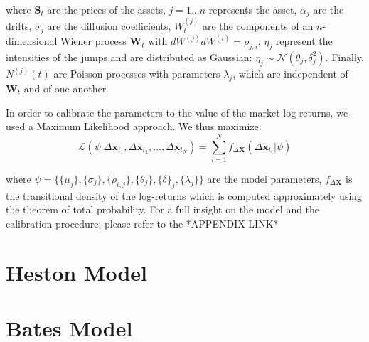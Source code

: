 where $\mathbf{S}_t$ are the prices of the assets, $j = 1 ... n$ represents the asset, $\alpha_j$ are the drifts, $\sigma_j$ are the diffusion coefficients, $W^{(j)}_t$ are the components of an $n$-dimensional Wiener process $ \mathbf{W}_t$ with $dW^{(j)}dW^{(i)}=\rho_{j,i}$, $\eta_j$ represent the intensities of the jumps and are distributed as Gaussian: $\eta_j \sim \mathcal{N}(\theta_j , \delta_j^2)$. Finally, $N^{(j)}(t)$ are Poisson processes with parameters $\lambda_j$, which are independent of $\mathbf{W}_t$ and of one another. 

In order to calibrate the parameters to the value of the market log-returns, we used a Maximum Likelihood approach. We thus maximize:
\begin{equation}
\mathcal{L}(\psi | \Delta \mathbf{x}_{t_1},\Delta \mathbf{x}_{t_2},\dots,\Delta \mathbf{x}_{t_N}) = \sum_{i=1}^{N} f_{\Delta \mathbf{X}}(\Delta\mathbf{x}_{t_i} | \psi)
\end{equation}

where $\psi = \{ \{\mu_j\},\{\sigma_j\},\{\rho_{i,j}\},\{\theta_j\},\{\delta\}_j,\{\lambda_j\} \}$ are the model parameters, $f_{\Delta \mathbf{X}}$ is the transitional density of the log-returns which is computed approximately using the theorem of total probability.
For a full insight on the model and the calibration procedure, please refer to the *APPENDIX LINK*


\section{Heston Model}



\section{Bates Model}



